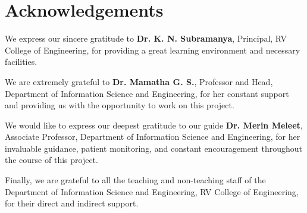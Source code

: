 \chapter*{Acknowledgements}
\thispagestyle{empty}
\addborder
{}

We express our sincere gratitude to \textbf{Dr. K. N. Subramanya}, Principal, RV College of Engineering, for providing a great learning environment and necessary facilities.

We are extremely grateful to \textbf{Dr. Mamatha G. S.}, Professor and Head, Department of Information Science and Engineering, for her constant support and providing us with the opportunity to work on this project.

We would like to express our deepest gratitude to our guide \textbf{Dr. Merin Meleet}, Associate Professor, Department of Information Science and Engineering, for her invaluable guidance, patient monitoring, and constant encouragement throughout the course of this project.

Finally, we are grateful to all the teaching and non-teaching staff of the Department of Information Science and Engineering, RV College of Engineering, for their direct and indirect support.

